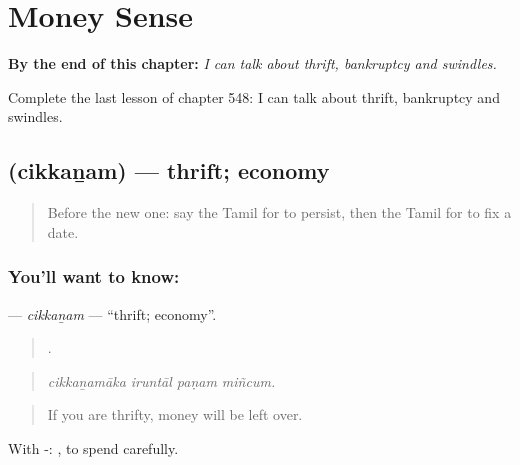 
\chapter{Money Sense}
\label{ch:ta-money-sense}

\begin{chapteropening}
\textbf{By the end of this chapter:} \emph{I can talk about thrift, bankruptcy and swindles.}

Complete the last lesson of chapter 548: I can talk about thrift, bankruptcy and swindles.
\end{chapteropening}

\section[\texorpdfstring{\ta{சிக்கனம்} (cikkaṉam)}{சிக்கனம் (cikkaṉam)}]{ (cikkaṉam) — thrift; economy}

\label{lesson:TA-C548-cikkanam}



\begin{quote}
Before the new one: say the Tamil for to persist, then the Tamil for to fix a date.
\end{quote}

\subsection*{You'll want to know: }
\textbf{} — \emph{cikkaṉam} — \textquotedblleft{}thrift; economy\textquotedblright{}.

\begin{quote}
   .
\end{quote}

\begin{quote}
\emph{cikkaṉamāka iruntāl paṇam miñcum.}
\end{quote}

\begin{quote}
If you are thrifty, money will be left over.
\end{quote}

With -:   , to spend carefully.

